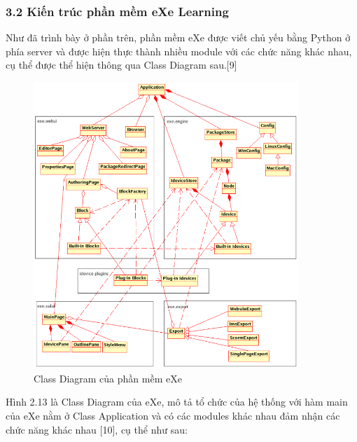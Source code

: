 \subsubsection{3.2 Kiến trúc phần mềm eXe Learning}
Như đã trình bày ở phần trên, phần mềm eXe được viết chủ yếu bằng Python ở phía server và được hiện thực thành nhiều module với các chức năng khác nhau, cụ thể được thể hiện thông qua Class Diagram sau.[9]

\begin{center}
	\begin{figure}[htp]
		\begin{center}
			\includegraphics[width=10cm]{Chapter2/Pictures/picture213.png}
		\end{center}
		\caption{Class Diagram của phần mềm eXe}
		\label{refpicture213}
	\end{figure}
\end{center}

\newpage

Hình 2.13 là Class Diagram của eXe, mô tả tổ chức của hệ thống với hàm main của eXe nằm ở Class Application và có các modules khác nhau đảm nhận các chức năng khác nhau [10], cụ thể như sau:

